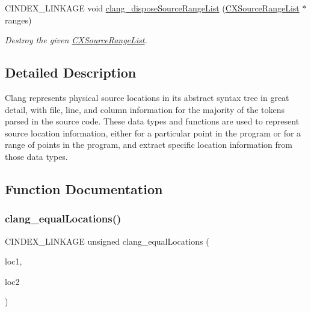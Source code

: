\begin{DoxyCompactItemize}
\mbox{\label{group__CINDEX__LOCATIONS_ga6305dd3e01bbfa8a999f47bd2cae2506}} 
C\+I\+N\+D\+E\+X\+\_\+\+L\+I\+N\+K\+A\+GE void \mbox{\hyperlink{group__CINDEX__LOCATIONS_ga6305dd3e01bbfa8a999f47bd2cae2506}{clang\+\_\+dispose\+Source\+Range\+List}} (\mbox{\hyperlink{structCXSourceRangeList}{C\+X\+Source\+Range\+List}} $\ast$ranges)
\begin{DoxyCompactList}\small\item\em Destroy the given {\ttfamily \mbox{\hyperlink{structCXSourceRangeList}{C\+X\+Source\+Range\+List}}}. \end{DoxyCompactList}\end{DoxyCompactItemize}


\subsection{Detailed Description}
Clang represents physical source locations in its abstract syntax tree in great detail, with file, line, and column information for the majority of the tokens parsed in the source code. These data types and functions are used to represent source location information, either for a particular point in the program or for a range of points in the program, and extract specific location information from those data types. 

\subsection{Function Documentation}
\mbox{\label{group__CINDEX__LOCATIONS_gabb1ee8108ded5d3eafa6d059eb473ef8}} 
\subsubsection{\texorpdfstring{clang\+\_\+equal\+Locations()}{clang\_equalLocations()}}
{\footnotesize\ttfamily C\+I\+N\+D\+E\+X\+\_\+\+L\+I\+N\+K\+A\+GE unsigned clang\+\_\+equal\+Locations (\begin{DoxyParamCaption}\item[{\mbox{\hyperlink{structCXSourceLocation}{C\+X\+Source\+Location}}}]{loc1,  }\item[{\mbox{\hyperlink{structCXSourceLocation}{C\+X\+Source\+Location}}}]{loc2 }\end{DoxyParamCaption})}



